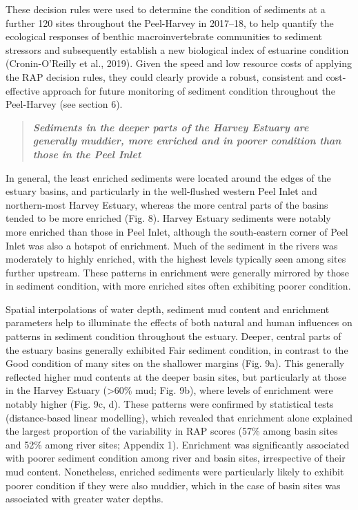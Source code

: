 \documentclass[
]{book}
\begin{document}
These decision rules were used to determine the condition of sediments at a further 120 sites throughout the Peel-Harvey in 2017--18, to help quantify the ecological responses of benthic macroinvertebrate communities to sediment stressors and subsequently establish a new biological index of estuarine condition (Cronin-O'Reilly et al., 2019). Given the speed and low resource costs of applying the RAP decision rules, they could clearly provide a robust, consistent and cost-effective approach for future monitoring of sediment condition throughout the Peel-Harvey (see section 6).

\begin{quote}
\textbf{\emph{Sediments in the deeper parts of the Harvey Estuary are generally muddier, more enriched and in poorer condition than those in the Peel Inlet}}
\end{quote}

In general, the least enriched sediments were located around the edges of the estuary basins, and particularly in the well-flushed western Peel Inlet and northern-most Harvey Estuary, whereas the more central parts of the basins tended to be more enriched (Fig. 8). Harvey Estuary sediments were notably more enriched than those in Peel Inlet, although the south-eastern corner of Peel Inlet was also a hotspot of enrichment. Much of the sediment in the rivers was moderately to highly enriched, with the highest levels typically seen among sites further upstream. These patterns in enrichment were generally mirrored by those in sediment condition, with more enriched sites often exhibiting poorer condition.

Spatial interpolations of water depth, sediment mud content and enrichment parameters help to illuminate the effects of both natural and human influences on patterns in sediment condition throughout the estuary. Deeper, central parts of the estuary basins generally exhibited Fair sediment condition, in contrast to the Good condition of many sites on the shallower margins (Fig. 9a). This generally reflected higher mud contents at the deeper basin sites, but particularly at those in the Harvey Estuary (\textgreater60\% mud; Fig. 9b), where levels of enrichment were notably higher (Fig. 9c, d). These patterns were confirmed by statistical tests (distance-based linear modelling), which revealed that enrichment alone explained the largest proportion of the variability in RAP scores (57\% among basin sites and 52\% among river sites; Appendix 1). Enrichment was significantly associated with poorer sediment condition among river and basin sites, irrespective of their mud content. Nonetheless, enriched sediments were particularly likely to exhibit poorer condition if they were also muddier, which in the case of basin sites was associated with greater water depths.
\end{document}
